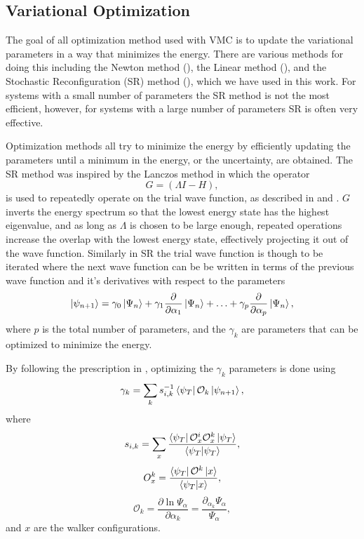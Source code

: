 \subsection{Variational Optimization}
The goal of all optimization method used with VMC is to update the variational parameters in a way that minimizes the energy. There are various methods for doing this including the Newton method (\cite{casalegno2003,umrigar2005}), the Linear method (\cite{toulouse2007}), and the Stochastic Reconfiguration (SR) method (\cite{casula2004,sorella2001,sorella2005}), which we have used in this work. For systems with a small number of parameters the SR method is not the most efficient, however, for systems with a large number of parameters SR is often very effective.

Optimization methods all try to minimize the energy by efficiently updating the parameters until a minimum in the energy, or the uncertainty, are obtained. The SR method was inspired by the Lanczos method in which the operator
\begin{equation}
   G = \left(\Lambda I - H\right),
\end{equation}
is used to repeatedly operate on the trial wave function, as described in \cite{heeb1994} and \cite{sorella2001}. $G$ inverts the energy spectrum so that the lowest energy state has the highest eigenvalue, and as long as $\Lambda$ is chosen to be large enough, repeated operations increase the overlap with the lowest energy state, effectively projecting it out of the wave function. Similarly in SR the trial wave function is though to be iterated where the next wave function can be be written in terms of the previous wave function and it's derivatives with respect to the parameters
\begin{equation}
   \left| \psi_{n+1} \right> = \gamma_0\left| \Psi_n \right> + \gamma_1\frac{\partial}{\partial \alpha_1}\left| \Psi_n \right> + \ldots + \gamma_p\frac{\partial}{\partial \alpha_p}\left| \Psi_n \right>,
   \label{equ:SRapproxgamma}
\end{equation}
where $p$ is the total number of parameters, and the $\gamma_k$ are parameters that can be optimized to minimize the energy.

By following the prescription in \cite{sorella2001}, optimizing the $\gamma_k$ parameters is done using
\begin{equation}
   \gamma_k = \sum\limits_k s^{-1}_{i,k} \left< \psi_T \right|\mathcal{O}_k\left| \psi_{n+1} \right>,
\end{equation}
where
\begin{equation}
   s_{i,k} = \sum\limits_x \frac{\left< \psi_T \right|\mathcal{O}^i_x\mathcal{O}^k_x\left| \psi_T \right>}{\left< \psi_T | \psi_T \right>},
\end{equation}
\begin{equation}
   O^k_x = \frac{\left< \psi_T \right|\mathcal{O}^k\left| x \right>}{\left< \psi_T | x \right>},
\end{equation}
\begin{equation}
   \mathcal{O}_k = \frac{\partial \ln \Psi_\alpha}{\partial \alpha_k} = \frac{\partial_{\alpha_k} \Psi_\alpha}{\Psi_\alpha},
\end{equation}
and $x$ are the walker configurations.

